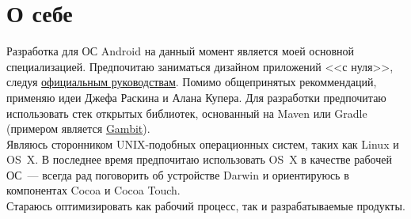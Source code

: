   \section*{О себе}

    Разработка для ОС Android на данный момент является моей основной специализацией.
    Предпочитаю заниматься дизайном приложений <<с нуля>>, следуя
    \href{https://developer.android.com/design/}{официальным руководствам}.
    Помимо общепринятых рекоммендаций, применяю идеи Джефа Раскина
    и Алана Купера. Для разработки предпочитаю использовать стек
    открытых библиотек, основанный на Maven или Gradle (примером является
    \href{https://github.com/ming13/gambit}{Gambit}). \\

    Являюсь сторонником UNIX-подобных операционных систем,
    таких как Linux и OS~X. В последнее время предпочитаю использовать
    OS~X в качестве рабочей ОС~--- всегда рад поговорить об устройстве Darwin
    и ориентируюсь в компонентах Cocoa и Cocoa Touch. \\

    Стараюсь оптимизировать как рабочий процесс,
    так и разрабатываемые продукты. \\

  \vfill



